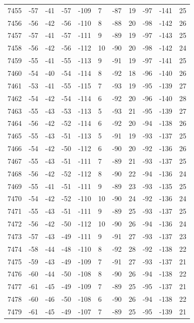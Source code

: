\begin{table}[H]
\begin{tabular}{lllllllllll}
7455 & -57 & -41 & -57 & -109 & 7 & -87 & 19 & -97 & -141 & 25 \\
7456 & -56 & -42 & -56 & -110 & 8 & -88 & 20 & -98 & -142 & 26 \\
7457 & -57 & -41 & -57 & -111 & 9 & -89 & 19 & -97 & -143 & 25 \\
7458 & -56 & -42 & -56 & -112 & 10 & -90 & 20 & -98 & -142 & 24 \\
7459 & -55 & -41 & -55 & -113 & 9 & -91 & 19 & -97 & -141 & 25 \\
7460 & -54 & -40 & -54 & -114 & 8 & -92 & 18 & -96 & -140 & 26 \\
7461 & -53 & -41 & -55 & -115 & 7 & -93 & 19 & -95 & -139 & 27 \\
7462 & -54 & -42 & -54 & -114 & 6 & -92 & 20 & -96 & -140 & 28 \\
7463 & -55 & -43 & -53 & -113 & 5 & -93 & 21 & -95 & -139 & 27 \\
7464 & -56 & -42 & -52 & -114 & 6 & -92 & 20 & -94 & -138 & 26 \\
7465 & -55 & -43 & -51 & -113 & 5 & -91 & 19 & -93 & -137 & 25 \\
7466 & -54 & -42 & -50 & -112 & 6 & -90 & 20 & -92 & -136 & 26 \\
7467 & -55 & -43 & -51 & -111 & 7 & -89 & 21 & -93 & -137 & 25 \\
7468 & -56 & -42 & -52 & -112 & 8 & -90 & 22 & -94 & -136 & 24 \\
7469 & -55 & -41 & -51 & -111 & 9 & -89 & 23 & -93 & -135 & 25 \\
7470 & -54 & -42 & -52 & -110 & 10 & -90 & 24 & -92 & -136 & 24 \\
7471 & -55 & -43 & -51 & -111 & 9 & -89 & 25 & -93 & -137 & 25 \\
7472 & -56 & -42 & -50 & -112 & 10 & -90 & 26 & -94 & -136 & 24 \\
7473 & -57 & -43 & -49 & -111 & 9 & -91 & 27 & -93 & -137 & 23 \\
7474 & -58 & -44 & -48 & -110 & 8 & -92 & 28 & -92 & -138 & 22 \\
7475 & -59 & -43 & -49 & -109 & 7 & -91 & 27 & -93 & -137 & 21 \\
7476 & -60 & -44 & -50 & -108 & 8 & -90 & 26 & -94 & -138 & 22 \\
7477 & -61 & -45 & -49 & -109 & 7 & -89 & 25 & -95 & -137 & 21 \\
7478 & -60 & -46 & -50 & -108 & 6 & -90 & 26 & -94 & -138 & 22 \\
7479 & -61 & -45 & -49 & -107 & 7 & -89 & 25 & -95 & -139 & 21 \\

\end{tabular}
\end{table}
